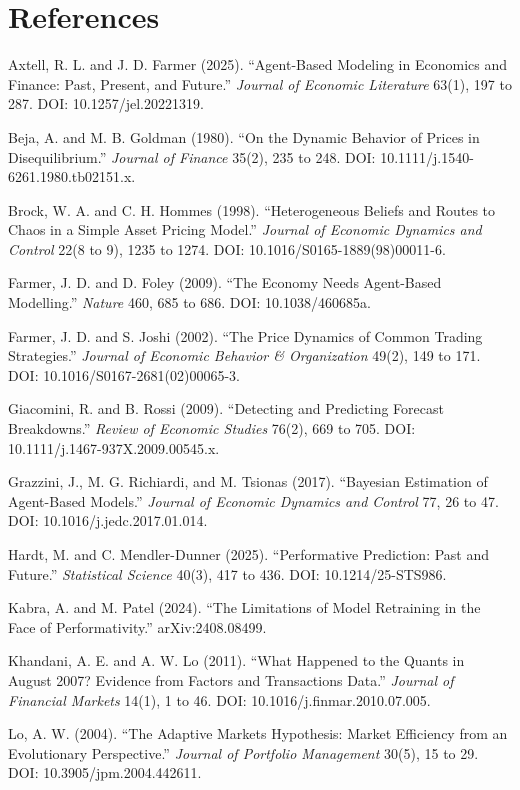 \documentclass[11pt]{article}
\begin{document}
\section*{References}

\begin{small}
\setlength{\parskip}{0.3em}

Axtell, R. L. and J. D. Farmer (2025). ``Agent-Based Modeling in Economics and Finance: Past, Present, and Future.'' \textit{Journal of Economic Literature} 63(1), 197 to 287. DOI: 10.1257/jel.20221319.

Beja, A. and M. B. Goldman (1980). ``On the Dynamic Behavior of Prices in Disequilibrium.'' \textit{Journal of Finance} 35(2), 235 to 248. DOI: 10.1111/j.1540-6261.1980.tb02151.x.

Brock, W. A. and C. H. Hommes (1998). ``Heterogeneous Beliefs and Routes to Chaos in a Simple Asset Pricing Model.'' \textit{Journal of Economic Dynamics and Control} 22(8 to 9), 1235 to 1274. DOI: 10.1016/S0165-1889(98)00011-6.

Farmer, J. D. and D. Foley (2009). ``The Economy Needs Agent-Based Modelling.'' \textit{Nature} 460, 685 to 686. DOI: 10.1038/460685a.

Farmer, J. D. and S. Joshi (2002). ``The Price Dynamics of Common Trading Strategies.'' \textit{Journal of Economic Behavior \& Organization} 49(2), 149 to 171. DOI: 10.1016/S0167-2681(02)00065-3.

Giacomini, R. and B. Rossi (2009). ``Detecting and Predicting Forecast Breakdowns.'' \textit{Review of Economic Studies} 76(2), 669 to 705. DOI: 10.1111/j.1467-937X.2009.00545.x.

Grazzini, J., M. G. Richiardi, and M. Tsionas (2017). ``Bayesian Estimation of Agent-Based Models.'' \textit{Journal of Economic Dynamics and Control} 77, 26 to 47. DOI: 10.1016/j.jedc.2017.01.014.

Hardt, M. and C. Mendler-Dunner (2025). ``Performative Prediction: Past and Future.'' \textit{Statistical Science} 40(3), 417 to 436. DOI: 10.1214/25-STS986.

Kabra, A. and M. Patel (2024). ``The Limitations of Model Retraining in the Face of Performativity.'' arXiv:2408.08499.

Khandani, A. E. and A. W. Lo (2011). ``What Happened to the Quants in August 2007? Evidence from Factors and Transactions Data.'' \textit{Journal of Financial Markets} 14(1), 1 to 46. DOI: 10.1016/j.finmar.2010.07.005.

Lo, A. W. (2004). ``The Adaptive Markets Hypothesis: Market Efficiency from an Evolutionary Perspective.'' \textit{Journal of Portfolio Management} 30(5), 15 to 29. DOI: 10.3905/jpm.2004.442611.


\end{small}
\end{document}
